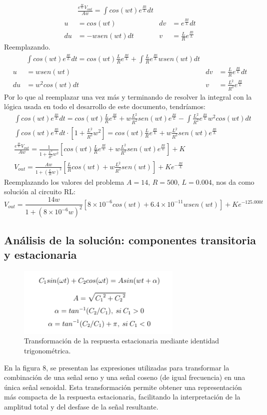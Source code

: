 \documentclass{article}
\begin{document}
\begin{align*}
    &\frac{e^{\frac{Rt}{L}}V_{out}}{Aw}=\int cos(wt)e^{\frac{Rt}{L}}dt \\
    u&=cos(wt)
    &dv&=e^{\frac{Rt}{L}}dt\\
    du&=-wsen(wt)dt
    &v&=\frac{L}{R}e^{\frac{Rt}{L}}
\end{align*}
Reemplazando.
\begin{align*}
    &\int cos(wt)e^{\frac{Rt}{L}}dt=cos(wt)\frac{L}{R}e^{\frac{Rt}{L}}+\int \frac{L}{R}e^{\frac{Rt}{L}}wsen(wt)dt \\
    u&=wsen(wt)
    &dv&=\frac{L}{R}e^{\frac{Rt}{L}}dt\\
    du&=w^2cos(wt)dt
    &v&=\frac{L^2}{R^2}e^{\frac{Rt}{L}}
\end{align*}
Por lo que al reemplazar una vez más y terminando de resolver la integral con la lógica usada en todo el desarrollo de este documento, tendríamos: 
\begin{align*}
    &\int cos(wt)e^{\frac{Rt}{L}}dt=cos(wt)\frac{L}{R}e^{\frac{Rt}{L}}+w\frac{L^2}{R^2}sen(wt)e^{\frac{Rt}{L}}-\int\frac{L^2}{R^2}e^{\frac{Rt}{L}}w^2cos(wt)dt \\
    &\int cos(wt)e^{\frac{Rt}{L}}dt\cdot [1+\frac{L^2}{R^2}w^2]=cos(wt)\frac{L}{R}e^{\frac{Rt}{L}}+w\frac{L^2}{R^2}sen(wt)e^{\frac{Rt}{L}} \\
    &\frac{e^{\frac{Rt}{L}}V_{out}}{Aw}=\frac{1}{1+\frac{L^2}{R^2}w^2}[cos(wt)\frac{L}{R}e^{\frac{Rt}{L}}+w\frac{L^2}{R^2}sen(wt)e^{\frac{Rt}{L}}]+K \\
    &V_{out}=\frac{Aw}{1+(\frac{L}{R}w)^2}[\frac{L}{R}cos(wt)+w\frac{L^2}{R^2}sen(wt)]+Ke^{-\frac{Rt}{L}}
\end{align*}
Reemplazando los valores del problema \(A=14,\,R=500,\,L=0.004\), nos da como solución al circuito RL:
\[
    V_{out}=\frac{14w}{1+(8 \times 10^{-6}w)^2}[8 \times 10^{-6}cos(wt)+6.4 \times 10^{-11}wsen(wt)]+Ke^{-125.000t}
\]
\subsection{Análisis de la solución: componentes transitoria y estacionaria}
\begin{figure}[H]
    \centering
    \includegraphics[width=0.7\textwidth]{Sp22.png}
    \caption{Transformación de la respuesta estacionaria mediante identidad trigonométrica.}
    \label{fig:Sp22}
\end{figure}
En la figura 8, se presentan las expresiones utilizadas para transformar la combinación de una señal seno y una señal coseno (de igual frecuencia) en una única señal senoidal. Esta transformación permite obtener una representación más compacta de la respuesta estacionaria, facilitando la interpretación de la amplitud total y del desfase de la señal resultante.
\end{document}
